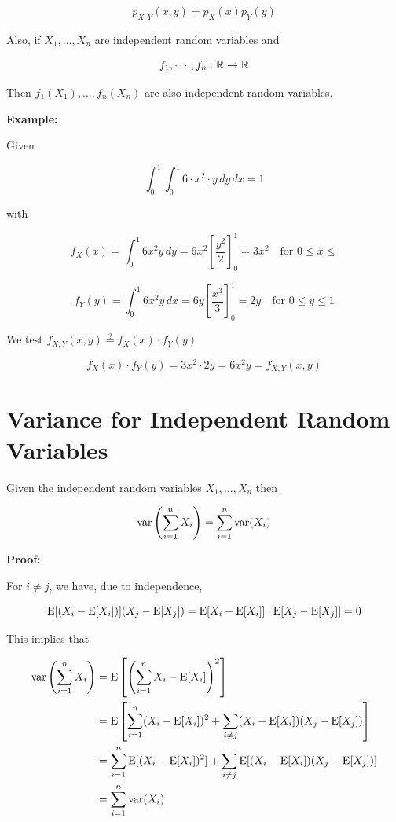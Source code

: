 \[
    p_{X,Y}(x, y) = p_X(x) p_Y(y)
\]

Also, if \(X_1, \dots, X_n\) are independent random variables and

\[
    f_1, \cdots, f_n : \mathbb{R} \to \mathbb{R}
\]

Then \(f_1(X_1), \dots, f_n(X_n)\) are also independent random variables.

\textbf{Example:}

Given

\[
    \int_0^1 \int_0^1 6\cdot x^2 \cdot y \, dy \, dx = 1
\]

with

\[
    f_X(x) = \int_0^1 6x^2 y \, dy = 6x^2 \left[\frac{y^2}{2}\right]_0^1 = 3x^2 \quad \text{for } 0 \leq x \leq
\]

\[
    f_Y(y) = \int_0^1 6x^2 y \, dx = 6y \left[\frac{x^3}{3}\right]_0^1 = 2y \quad \text{for } 0 \leq y \leq 1
\]

We test \(f_{X,Y}(x,y) \stackrel{?}{=} f_X(x) \cdot f_Y(y)\)

\[
    f_X(x) \cdot f_Y(y) = 3x^2 \cdot 2y = 6x^2y = f_{X,Y}(x,y)
\]

\section{Variance for Independent Random Variables}

Given the independent random variables \(X_1, \dots, X_n\) then

\[
    \mathrm{var} \left(\sum_{i = 1}^n X_i\right) = \sum_{i = 1}^{n} \mathrm{var}(X_i)
\]

\textbf{Proof:}

For \(i \ne j\), we have, due to independence,

\[
    \mathrm{E}[(X_i - \mathrm{E}[X_i])](X_j - \mathrm{E}[X_j]) = \mathrm{E}[X_i - \mathrm{E}[X_i]] \cdot \mathrm{E}[X_j - \mathrm{E}[X_j]] = 0
\]

This implies that

\begin{align*}
    \mathrm{var}\left(\sum_{i=1}^n X_i\right) &= \mathrm{E}\left[\left(\sum_{i=1}^n X_i - \mathrm{E}[X_i]\right)^2\right] \\
    &= \mathrm{E}\left[\sum_{i=1}^n (X_i - \mathrm{E}[X_i])^2  + \sum_{i \ne j}(X_i - \mathrm{E}[X_i])(X_j - \mathrm{E}[X_j])\right] \\
    &= \sum_{i=1}^n \mathrm{E}[(X_i - \mathrm{E}[X_i])^2] + \sum_{i \ne j} \mathrm{E}[(X_i - \mathrm{E}[X_i])(X_j - \mathrm{E}[X_j])] \\
    &= \sum_{i=1}^n \mathrm{var}(X_i)
\end{align*}

